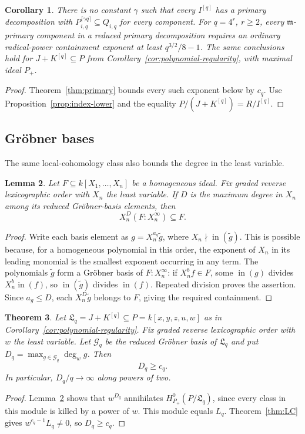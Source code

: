 \documentclass[11pt,a4paper,reqno]{amsart}
\numberwithin{equation}{section}
\theoremstyle{plain}
\newtheorem{theorem}{Theorem}[section]
\newtheorem{lemma}[theorem]{Lemma}
\newtheorem{corollary}[theorem]{Corollary}
\theoremstyle{definition}
\theoremstyle{remark}
\newcommand{\mm}{\mathfrak m}
\DeclareMathOperator{\ini}{in}
\begin{document}
\begin{corollary}\label{cor:ordinary-primary}
There is no constant $\gamma$ such that every $I^{[q]}$ has a primary
decomposition with
$P_{i,q}^{\lceil\gamma q\rceil}\subseteq Q_{i,q}$ for every component.
For $q=4^r$, $r\geq2$, every $\mm$-primary component in a reduced
primary decomposition requires an ordinary radical-power containment
exponent at least $q^{3/2}/8-1$.
The same conclusions hold for $J+K^{[q]}\subseteq P$ from
Corollary~\ref{cor:polynomial-regularity}, with maximal ideal $P_+$.
\end{corollary}
\begin{proof}
Theorem~\ref{thm:primary} bounds every such exponent below by $c_q$.
Use Proposition~\ref{prop:index-lower} and the equality
$P/(J+K^{[q]})=R/I^{[q]}$.
\end{proof}

\subsection{Gr\"obner bases}
The same local-cohomology class also bounds the degree in the least variable.

\begin{lemma}\label{lem:grevlex-saturation}
Let $F\subseteq k[X_1,\ldots,X_n]$ be a homogeneous ideal. Fix graded
reverse lexicographic order with $X_n$ the least variable. If $D$ is the maximum degree in $X_n$ among its reduced
Gr\"obner-basis elements, then
\[
X_n^D(F:X_n^\infty)\subseteq F.
\]
\end{lemma}
\begin{proof}
Write each basis element as $g=X_n^{a_g}\widetilde g$, where
$X_n\nmid\ini(\widetilde g)$. This is possible because,
for a homogeneous polynomial in this order, the exponent of $X_n$ in
its leading monomial is the smallest exponent occurring in any term.
The polynomials $\widetilde g$ form a Gr\"obner basis of
$F:X_n^\infty$: if $X_n^bf\in F$, some
$\ini(g)$ divides $X_n^b\ini(f)$, so
$\ini(\widetilde g)$ divides $\ini(f)$.
Repeated division proves the assertion. Since $a_g\leq D$, each
$X_n^D\widetilde g$ belongs to $F$, giving the required containment.
\end{proof}

\begin{theorem}\label{thm:groebner}
Let $\mathfrak L_q=J+K^{[q]}\subseteq P=k[x,y,z,u,w]$ as in
Corollary~\ref{cor:polynomial-regularity}. Fix graded reverse
lexicographic order with $w$ the least variable. Let $\mathcal G_q$ be the reduced Gr\"obner basis of $\mathfrak L_q$
and put $D_q=\max_{g\in\mathcal G_q}\deg_w g$. Then
\[
D_q\geq c_q.
\]
In particular, $D_q/q\to\infty$ along powers of two.
\end{theorem}
\begin{proof}
Lemma~\ref{lem:grevlex-saturation} shows that $w^{D_q}$ annihilates
$H^0_{P_+}(P/\mathfrak L_q)$, since every class in this module is killed
by a power of $w$. This module equals $L_q$. Theorem~\ref{thm:LC}
gives $w^{c_q-1}L_q\ne0$, so $D_q\geq c_q$.
\end{proof}
\end{document}
